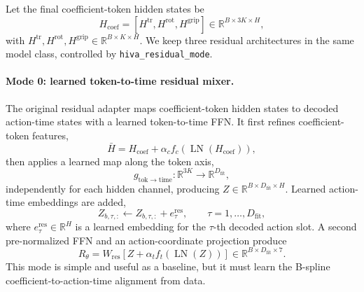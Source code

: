 \documentclass[10pt,twocolumn,letterpaper]{article}
\begin{document}
Let the final coefficient-token hidden states be
\begin{equation}
H_{\mathrm{coef}}
=
[H^{\mathrm{tr}},H^{\mathrm{rot}},H^{\mathrm{grip}}]
\in\mathbb{R}^{B\times 3K\times H},
\end{equation}
with $H^{\mathrm{tr}},H^{\mathrm{rot}},H^{\mathrm{grip}}\in\mathbb{R}^{B\times K\times H}$. We keep three residual architectures in the same model class, controlled by \texttt{hiva\_residual\_mode}.

\paragraph{Mode 0: learned token-to-time residual mixer.}
The original residual adapter maps coefficient-token hidden states to decoded action-time states with a learned token-to-time FFN. It first refines coefficient-token features,
\begin{equation}
\bar H
=
H_{\mathrm{coef}}
+
\alpha_c f_c\!\left(\operatorname{LN}(H_{\mathrm{coef}})\right),
\end{equation}
then applies a learned map along the token axis,
\begin{equation}
g_{\mathrm{tok}\to\mathrm{time}}:\mathbb{R}^{3K}\rightarrow\mathbb{R}^{D_{\mathrm{fit}}},
\end{equation}
independently for each hidden channel, producing $Z\in\mathbb{R}^{B\times D_{\mathrm{fit}}\times H}$. Learned action-time embeddings are added,
\begin{equation}
Z_{b,\tau,:}\leftarrow Z_{b,\tau,:}+e_{\tau}^{\mathrm{res}},
\qquad \tau=1,\ldots,D_{\mathrm{fit}},
\end{equation}
where $e_{\tau}^{\mathrm{res}}\in\mathbb{R}^{H}$ is a learned embedding for the $\tau$-th decoded action slot. A second pre-normalized FFN and an action-coordinate projection produce
\begin{equation}
R_\theta=W_{\mathrm{res}}\left[Z+
\alpha_t f_t\!\left(\operatorname{LN}(Z)\right)\right]
\in\mathbb{R}^{B\times D_{\mathrm{fit}}\times 7}.
\end{equation}
This mode is simple and useful as a baseline, but it must learn the B-spline coefficient-to-action-time alignment from data.
\end{document}
